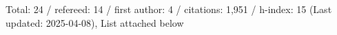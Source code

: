 Total: 24 / refereed: 14 / first author: 4 / citations: 1,951 / h-index: 15 (Last updated: 2025-04-08), List attached below